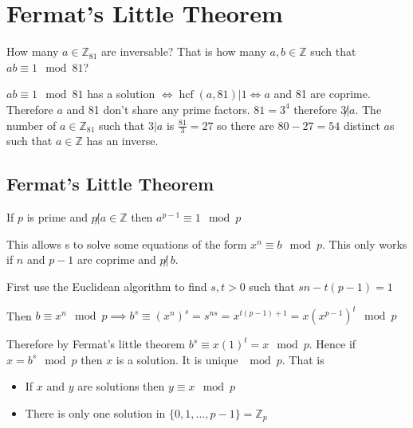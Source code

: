 \documentclass{article}
\newcommand{\bb}[1]{\mathbb{#1}}
\newcommand{\hcf}{\operatorname{hcf}}
\begin{document}
\section{Fermat's Little Theorem}

How many \(a\in\bb Z_{81}\) are inversable? That is how many \(a,b\in\bb Z\) such that \(ab\equiv 1\mod 81\)?

\(ab\equiv 1\mod 81\) has a solution \(\iff\hcf(a,81)|1\iff a\) and 81 are coprime. Therefore \(a\) and 81 don't share any prime factors. \(81=3^4\) therefore \(3\not|a\). The number of \(a\in\bb Z_{81}\) such that \(3|a\) is \(\frac{81}{3}=27\) so there are \(80-27=54\) distinct \(a\)s such that \(a\in\bb Z\) has an inverse.

\subsection*{Fermat's Little Theorem}

If \(p\) is prime and \(p\not|a\in\bb Z\) then \(a^{p-1}\equiv1\mod p\)

This allows s to solve some equations of the form \(x^n\equiv b\mod p\). This only works if \(n\) and \(p-1\) are coprime and \(p\not|\,b\). 

First use the Euclidean algorithm to find \(s,t>0\) such that \(sn-t(p-1)=1\)

Then \(b\equiv x^n\mod p\implies b^s\equiv (x^n)^s=s^{ns}=x^{t(p-1)+1}=x(x^{p-1})^t\mod p\)

Therefore by Fermat's little theorem \(b^s\equiv x(1)^t=x\mod p\). Hence if \(x=b^s\mod p\) then \(x\) is a solution. It is unique \(\mod p\). That is
\begin{itemize}
\item If \(x\) and \(y\) are solutions then \(y\equiv x\mod p\)
\item There is only one solution in \(\{0,1,\dotsc,p-1\}=\bb Z_p\)
\end{itemize}
\end{document}
